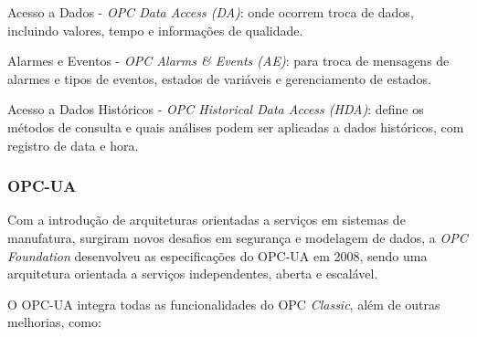         \begin{alineascomponto}
        	\item Acesso a Dados - \textit{\gls{OPC} Data Access (DA)}: onde ocorrem troca de dados, incluindo valores, tempo e informações de qualidade.
        	\item Alarmes e Eventos - \textit{\gls{OPC} Alarms \& Events (AE)}: para troca de mensagens de alarmes e tipos de eventos, estados de variáveis e gerenciamento de estados.
        	\item Acesso a Dados Históricos - \textit{\gls{OPC} Historical Data Access (HDA)}: define os métodos de consulta e quais análises podem ser aplicadas a dados históricos, com registro de data e hora.
        \end{alineascomponto}

    \subsubsection{OPC-UA}
    \label{sec:opc-ua}

        Com a introdução de arquiteturas orientadas a serviços em sistemas de manufatura, surgiram novos desafios em segurança e modelagem de dados, a \textit{OPC Foundation} desenvolveu as especificações do \gls{OPC-UA} em 2008, sendo uma arquitetura orientada a serviços independentes, aberta e escalável.
        
	    \begin{figure}[!h]
	    \end{figure}
        
        O \gls{OPC-UA} integra todas as funcionalidades do \gls{OPC} \textit{Classic}, além de outras melhorias, como:
        
